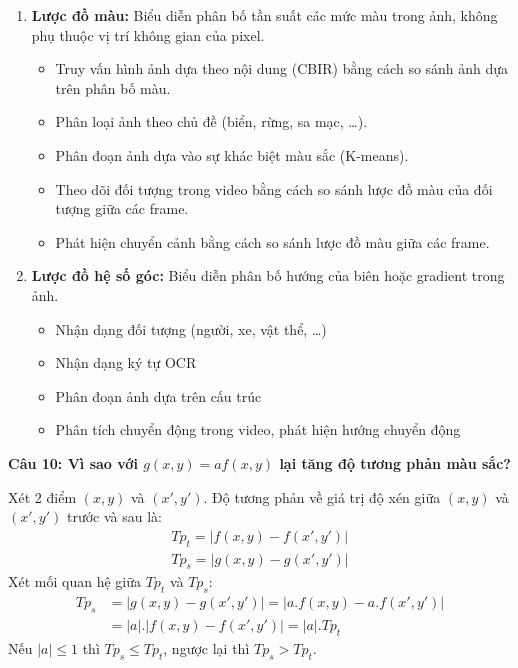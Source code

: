 \begin{enumerate}
	\item \textbf{Lược đồ màu:} Biểu diễn phân bố tần suất các mức màu trong ảnh, không phụ thuộc vị trí không gian của pixel.
	
	\begin{itemize}
		\item Truy vấn hình ảnh dựa theo nội dung (CBIR) bằng cách so sánh ảnh dựa trên phân bố màu.
		
		\item Phân loại ảnh theo chủ đề (biển, rừng, sa mạc, …).
		
		\item Phân đoạn ảnh dựa vào sự khác biệt màu sắc (K-means).
		
		\item Theo dõi đối tượng trong video bằng cách so sánh lược đồ màu của đối tượng giữa các frame.
		
		\item Phát hiện chuyển cảnh bằng cách so sánh lược đồ màu giữa các frame.
	\end{itemize}
	
	\item \textbf{Lược đồ hệ số góc:} Biểu diễn phân bố hướng của biên hoặc gradient trong ảnh.
	
	\begin{itemize}
		\item Nhận dạng đối tượng (người, xe, vật thể, …)
		
		\item Nhận dạng ký tự OCR
		
		\item Phân đoạn ảnh dựa trên cấu trúc
		
		\item Phân tích chuyển động trong video, phát hiện hướng chuyển động
	\end{itemize}
\end{enumerate}

\textbf{Câu 10: Vì sao với $g(x,y) = af(x,y)$ lại tăng độ tương phản màu sắc?}

Xét 2 điểm $(x, y)$ và $(x', y')$. Độ tương phản về giá trị độ xén giữa $(x, y)$ và $(x', y')$ trước và sau là:
\begin{gather*}
	Tp_t = |f(x, y) - f(x', y')| \\
	Tp_s = |g(x, y) - g(x', y')|
\end{gather*}
Xét mối quan hệ giữa $Tp_t$ và $Tp_s$:
\begin{align*}
	Tp_s &= |g(x, y) - g(x', y')| = |a.f(x, y) - a.f(x', y')| \\
		&= |a|.|f(x,y) - f(x',y')| = |a|.Tp_t
\end{align*}
Nếu $|a| \le 1$ thì $Tp_s \le Tp_t$, ngược lại thì $Tp_s > Tp_t$.

